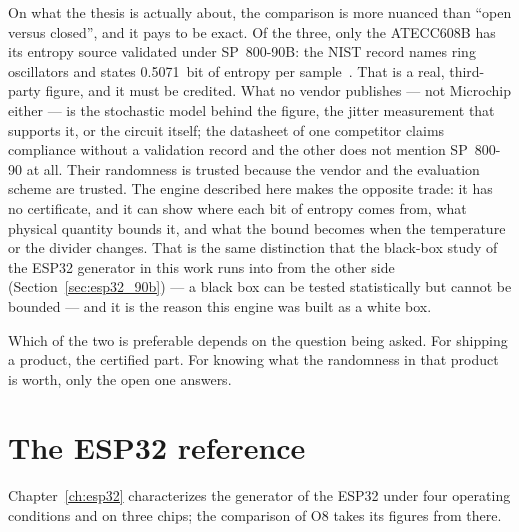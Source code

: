 On what the thesis is actually about, the comparison is more nuanced than
``open versus closed'', and it pays to be exact. Of the three, only the
ATECC608B has its entropy source validated under SP~800-90B: the NIST
record names ring oscillators and states 0.5071~bit of entropy per
sample~\cite{nist_esv_e46}. That is a real, third-party figure, and it must
be credited. What no vendor publishes --- not Microchip either --- is the
stochastic model behind the figure, the jitter measurement that supports
it, or the circuit itself; the datasheet of one competitor claims
compliance without a validation record and the other does not mention
SP~800-90 at all. Their randomness is trusted because the vendor and the
evaluation scheme are trusted. The engine described here makes the opposite
trade: it has no certificate, and it can show where each bit of entropy
comes from, what physical quantity bounds it, and what the bound becomes
when the temperature or the divider changes. That is the same distinction
that the black-box study of the ESP32 generator in this work runs into from
the other side (Section~\ref{sec:esp32_90b}) --- a black box can be tested
statistically but cannot be bounded --- and it is the reason this engine
was built as a white box.

Which of the two is preferable depends on the question being asked. For
shipping a product, the certified part. For knowing what the randomness in
that product is worth, only the open one answers.

\section{The ESP32 reference}
\label{sec:esp32_ref}

Chapter~\ref{ch:esp32} characterizes the generator of the ESP32 under
four operating conditions and on three chips; the comparison of O8 takes
its figures from there.

